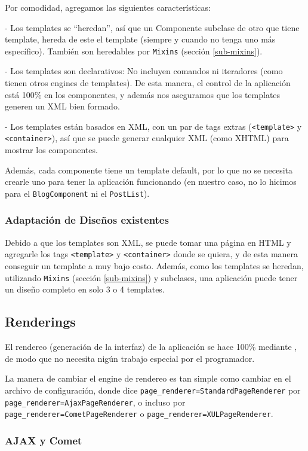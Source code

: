 Por comodidad, agregamos las siguientes características:

- Los templates se ``heredan'', así que un Componente subclase de otro que tiene template, hereda de este el template (siempre y cuando no tenga uno más específico). También son heredables por \verb"Mixins" (sección \ref{sub-mixins}).

- Los templates son declarativos: No incluyen comandos ni iteradores (como tienen otros engines de templates). De esta manera, el control de la aplicación está 100\% en los componentes, y además nos aseguramos que los templates generen un XML bien formado.

- Los templates están basados en XML, con un par de tags extras (\verb"<template>" y \verb"<container>"), así que se puede generar cualquier XML (como XHTML) para mostrar los componentes.

Además, cada componente tiene un template default, por lo que no se necesita crearle uno para tener la aplicación funcionando (en nuestro caso, no lo hicimos para el \verb"BlogComponent" ni el \verb"PostList").

\subsubsection{Adaptación de Diseños existentes}
\label{sub-templates-adapt}
Debido a que los templates son XML, se puede tomar una página en HTML y agregarle los tags \verb"<template>" y \verb"<container>" donde se quiera, y de esta manera conseguir un template a muy bajo costo. Además, como los templates se heredan, utilizando \verb"Mixins" (sección \ref{sub-mixins}) y subclases, una aplicación puede tener un diseño completo en solo 3 o 4 templates.

\subsection{Renderings}
\label{sub-render}
El rendereo (generación de la interfaz) de la aplicación se hace 100\% mediante \PWB, de modo que no necesita nigún trabajo especial por el programador.

La manera de cambiar el engine de rendereo es tan simple como cambiar en el archivo de configuración, donde dice \verb"page_renderer=StandardPageRenderer" por \verb"page_renderer=AjaxPageRenderer", o incluso por \verb"page_renderer=CometPageRenderer" o \verb"page_renderer=XULPageRenderer".

\subsubsection{AJAX y Comet}

